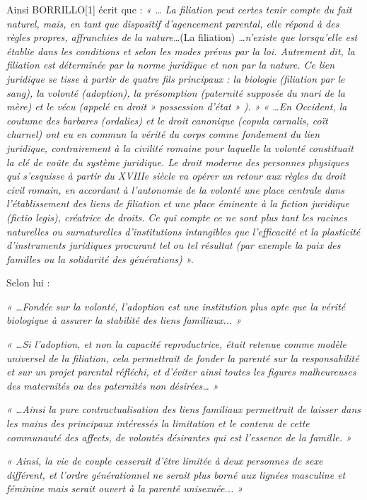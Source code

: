  Ainsi BORRILLO[1] écrit que : \emph{« … La filiation peut certes tenir compte du fait naturel, mais, en tant que dispositif d'agencement parental, elle répond à des règles propres, affranchies de la nature…}(La filiation)\emph{ …n'existe que lorsqu'elle est établie dans les conditions et selon les modes prévus par la loi. Autrement dit, la filiation est déterminée par la norme juridique et non par la nature. Ce lien juridique se tisse à partir de quatre fils principaux : la biologie (filiation par le sang), la volonté (adoption), la présomption (paternité supposée du mari de la mère) et le vécu (appelé en droit » possession d'état » ). »}
 \emph{« …En Occident, la coutume des barbares (ordalies) et le droit canonique (copula carnalis, coït charnel) ont eu en commun la vérité du corps comme fondement du lien juridique, contrairement à la civilité romaine pour laquelle la volonté constituait la clé de voûte du système juridique. Le droit moderne des personnes physiques qui s'esquisse à partir du XVIIIe siècle va opérer un retour aux règles du droit civil romain, en accordant à l'autonomie de la volonté une place centrale dans l'établissement des liens de filiation et une place éminente à la fiction juridique (fictio legis), créatrice de droits.}
 \emph{Ce qui compte ce ne sont plus tant les racines naturelles ou surnaturelles d'institutions intangibles que l'efficacité et la plasticité d'instruments juridiques procurant tel ou tel résultat (par exemple la paix des familles ou la solidarité des générations) ».}
 
 Selon lui :
 
  \emph{« …Fondée sur la volonté, l'adoption est une institution plus apte que la vérité biologique à assurer la stabilité des liens familiaux... »} 
  
 \emph{« …Si l'adoption, et non la capacité reproductrice, était retenue comme modèle universel de la filiation, cela permettrait de fonder la parenté sur la responsabilité et sur un projet parental réfléchi, et d'éviter ainsi toutes les figures malheureuses des maternités ou des paternités non désirées… »} 
 
 \emph{« …Ainsi la pure contractualisation des liens familiaux permettrait de laisser dans les mains des principaux intéressés la limitation et le contenu de cette communauté des affects, de volontés désirantes qui est l'essence de la famille. »} 
 
 \emph{« Ainsi, la vie de couple cesserait d'être limitée à deux personnes de sexe différent, et l'ordre générationnel ne serait plus borné aux lignées masculine et féminine mais serait ouvert à la parenté unisexuée... »}
 
